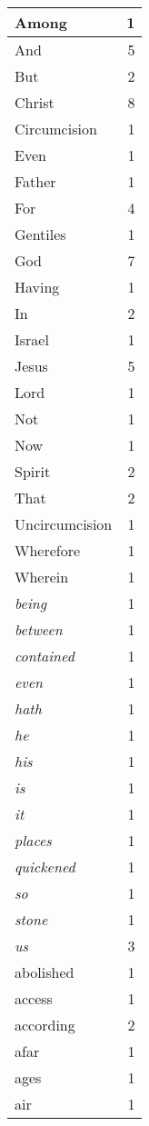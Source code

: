 \begin{center}
\begin{longtable}{l|r}
Among & 1\\ \hline 
And & 5\\ \hline 
But & 2\\ \hline 
Christ & 8\\ \hline 
Circumcision & 1\\ \hline 
Even & 1\\ \hline 
Father & 1\\ \hline 
For & 4\\ \hline 
Gentiles & 1\\ \hline 
God & 7\\ \hline 
Having & 1\\ \hline 
In & 2\\ \hline 
Israel & 1\\ \hline 
Jesus & 5\\ \hline 
Lord & 1\\ \hline 
Not & 1\\ \hline 
Now & 1\\ \hline 
Spirit & 2\\ \hline 
That & 2\\ \hline 
Uncircumcision & 1\\ \hline 
Wherefore & 1\\ \hline 
Wherein & 1\\ \hline 
\emph{being} & 1\\ \hline 
\emph{between} & 1\\ \hline 
\emph{contained} & 1\\ \hline 
\emph{even} & 1\\ \hline 
\emph{hath} & 1\\ \hline 
\emph{he} & 1\\ \hline 
\emph{his} & 1\\ \hline 
\emph{is} & 1\\ \hline 
\emph{it} & 1\\ \hline 
\emph{places} & 1\\ \hline 
\emph{quickened} & 1\\ \hline 
\emph{so} & 1\\ \hline 
\emph{stone} & 1\\ \hline 
\emph{us} & 3\\ \hline 
abolished & 1\\ \hline 
access & 1\\ \hline 
according & 2\\ \hline 
afar & 1\\ \hline 
ages & 1\\ \hline 
air & 1\\ \hline 

\end{longtable}
\end{center}
